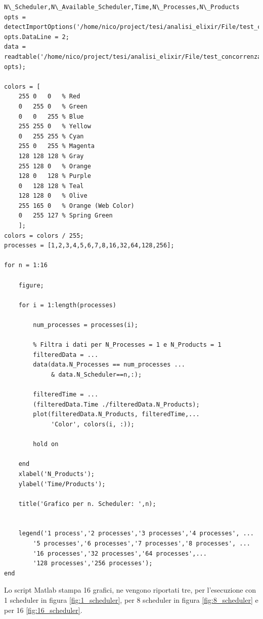 \begin{lstlisting}[language=none,captionpos=b,
	caption={File csv},label={lst:analisi_matlab}]
N\_Scheduler,N\_Available_Scheduler,Time,N\_Processes,N\_Products
opts = detectImportOptions('/home/nico/project/tesi/analisi_elixir/File/test_concorrenza2.csv');
opts.DataLine = 2;
data = readtable('/home/nico/project/tesi/analisi_elixir/File/test_concorrenza2.csv', opts);

colors = [
    255 0   0   % Red
    0   255 0   % Green
    0   0   255 % Blue
    255 255 0   % Yellow
    0   255 255 % Cyan
    255 0   255 % Magenta
    128 128 128 % Gray
    255 128 0   % Orange
    128 0   128 % Purple
    0   128 128 % Teal
    128 128 0   % Olive
    255 165 0   % Orange (Web Color)
    0   255 127 % Spring Green
    ];
colors = colors / 255;
processes = [1,2,3,4,5,6,7,8,16,32,64,128,256];

for n = 1:16

    figure;

    for i = 1:length(processes)

        num_processes = processes(i);

        % Filtra i dati per N_Processes = 1 e N_Products = 1
        filteredData = ... 
		data(data.N_Processes == num_processes ... 
		     & data.N_Scheduler==n,:);

        filteredTime = ... 
		(filteredData.Time ./filteredData.N_Products);
        plot(filteredData.N_Products, filteredTime,... 
		     'Color', colors(i, :));

        hold on

    end
    xlabel('N_Products');
    ylabel('Time/Products');

    title('Grafico per n. Scheduler: ',n);


    legend('1 process','2 processes','3 processes','4 processes', ...
        '5 processes','6 processes','7 processes','8 processes', ...
        '16 processes','32 processes','64 processes',... 
		'128 processes','256 processes');
end
\end{lstlisting}

Lo script Matlab stampa 16 grafici, ne vengono riportati
tre, per l'esecuzione con 1 scheduler in figura \ref{fig:1_scheduler},
per 8 scheduler in figura \ref{fig:8_scheduler}
e per 16 \ref{fig:16_scheduler}.

